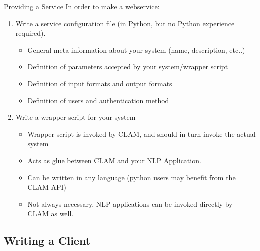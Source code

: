 \documentclass[compress]{beamer}
\begin{document}
\begin{frame}
    \begin{block}{Providing a Service}
        In order to make a webservice:
        \begin{enumerate}
            \item Write a service configuration file \footnotesize{(in Python, but no Python experience required)}. 
            \begin{itemize}
                \item General meta information about your system \footnotesize{(name, description, etc..)}
                \item Definition of parameters accepted by your system/wrapper script
                \item Definition of input formats and output formats
                \item Definition of users and authentication method
            \end{itemize}
            \item Write a wrapper script for your system
            \begin{itemize}
                \item Wrapper script is invoked by CLAM, and should in turn invoke the actual system
                \item Acts as glue between CLAM and your NLP Application.
                \item Can be written in any language (python users may benefit from the CLAM API)
                \item Not always necessary, NLP applications can be invoked directly by CLAM as well.
            \end{itemize}
        \end{enumerate}
    \end{block}

\end{frame}


\subsection{Writing a Client}
\end{document}
